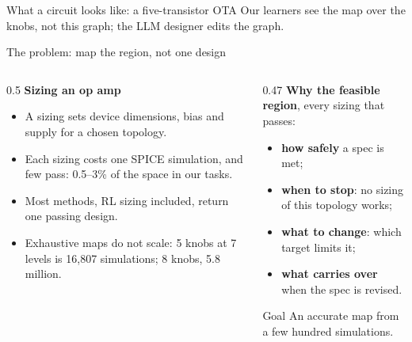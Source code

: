\begin{frame}{What a circuit looks like: a five-transistor OTA}
  \vspace{1mm}
  {\footnotesize\color{uscgray} Our learners see the map over the knobs, not this graph; the LLM designer edits the
  graph.}
\end{frame}

\begin{frame}{The problem: map the region, not one design}
  \begin{columns}[T]
    \begin{column}{0.5\textwidth}
      \small
      \textbf{Sizing an op amp}
      \begin{itemize}
        \item A \alert{sizing} sets device dimensions, bias and supply for a chosen topology.
        \item Each sizing costs one SPICE simulation, and few pass: 0.5--3\% of the space in our tasks.
        \item Most methods, RL sizing included, return \alert{one} passing design.
        \item Exhaustive maps do not scale: 5 knobs at 7 levels is 16,807 simulations; 8 knobs, 5.8 million.
      \end{itemize}
    \end{column}
    \begin{column}{0.47\textwidth}
      \small
      \textbf{Why the feasible region}, every sizing that passes:
      \begin{itemize}
        \item \textbf{how safely} a spec is met;
        \item \textbf{when to stop}: no sizing of this topology works;
        \item \textbf{what to change}: which target limits it;
        \item \textbf{what carries over} when the spec is revised.
      \end{itemize}
      \vspace{1mm}
      \begin{block}{Goal}
        An accurate map from a few hundred simulations.
      \end{block}
    \end{column}
  \end{columns}
\end{frame}

